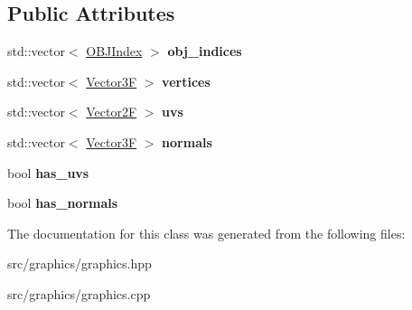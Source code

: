 \subsection*{Public Attributes}
\begin{DoxyCompactItemize}
\item 
\mbox{\label{classtz_1_1graphics_1_1model_1_1_o_b_j_model_a0f2904907849a9ca1162a60e17d5deb9}} 
std\+::vector$<$ \mbox{\hyperlink{classtz_1_1graphics_1_1model_1_1_o_b_j_index}{O\+B\+J\+Index}} $>$ {\bfseries obj\+\_\+indices}
\item 
\mbox{\label{classtz_1_1graphics_1_1model_1_1_o_b_j_model_aec5e5251ce3c0014eea3a39efe4054ea}} 
std\+::vector$<$ \mbox{\hyperlink{class_vector3}{Vector3F}} $>$ {\bfseries vertices}
\item 
\mbox{\label{classtz_1_1graphics_1_1model_1_1_o_b_j_model_a2c07f0f503215dae74a6e7178680d997}} 
std\+::vector$<$ \mbox{\hyperlink{class_vector2}{Vector2F}} $>$ {\bfseries uvs}
\item 
\mbox{\label{classtz_1_1graphics_1_1model_1_1_o_b_j_model_abf68bdb8296b2a8298e591bfbf0075da}} 
std\+::vector$<$ \mbox{\hyperlink{class_vector3}{Vector3F}} $>$ {\bfseries normals}
\item 
\mbox{\label{classtz_1_1graphics_1_1model_1_1_o_b_j_model_a0f8dd322a5a87885243cb82d3361d643}} 
bool {\bfseries has\+\_\+uvs}
\item 
\mbox{\label{classtz_1_1graphics_1_1model_1_1_o_b_j_model_ac5252486a68257bbc480d516d10bf7ba}} 
bool {\bfseries has\+\_\+normals}
\end{DoxyCompactItemize}


The documentation for this class was generated from the following files\+:\begin{DoxyCompactItemize}
\item 
src/graphics/graphics.\+hpp\item 
src/graphics/graphics.\+cpp\end{DoxyCompactItemize}
